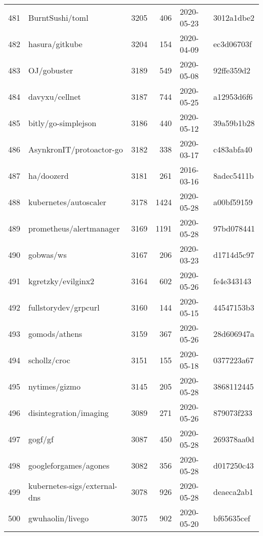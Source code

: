 \begin{longtable}{llrrll}
    481 &                                    BurntSushi/toml &   3205 &    406 & 2020-05-23 &  3012a1dbe2 \\
    482 &                                     hasura/gitkube &   3204 &    154 & 2020-04-09 &  ec3d06703f \\
    483 &                                        OJ/gobuster &   3189 &    549 & 2020-05-08 &  92ffe359d2 \\
    484 &                                     davyxu/cellnet &   3187 &    744 & 2020-05-25 &  a12953d6f6 \\
    485 &                                bitly/go-simplejson &   3186 &    440 & 2020-05-12 &  39a59b1b28 \\
    486 &                           AsynkronIT/protoactor-go &   3182 &    338 & 2020-03-17 &  c483abfa40 \\
    487 &                                         ha/doozerd &   3181 &    261 & 2016-03-16 &  8adec5411b \\
    488 &                              kubernetes/autoscaler &   3178 &   1424 & 2020-05-28 &  a00bf59159 \\
    489 &                            prometheus/alertmanager &   3169 &   1191 & 2020-05-28 &  97bd078441 \\
    490 &                                          gobwas/ws &   3167 &    206 & 2020-03-23 &  d1714d5c97 \\
    491 &                                 kgretzky/evilginx2 &   3164 &    602 & 2020-05-26 &  fe4e343143 \\
    492 &                               fullstorydev/grpcurl &   3160 &    144 & 2020-05-15 &  44547153b3 \\
    493 &                                      gomods/athens &   3159 &    367 & 2020-05-26 &  28d606947a \\
    494 &                                       schollz/croc &   3151 &    155 & 2020-05-18 &  0377223a67 \\
    495 &                                      nytimes/gizmo &   3145 &    205 & 2020-05-28 &  3868112445 \\
    496 &                             disintegration/imaging &   3089 &    271 & 2020-05-26 &  879073f233 \\
    497 &                                            gogf/gf &   3087 &    450 & 2020-05-28 &  269378aa0d \\
    498 &                              googleforgames/agones &   3082 &    356 & 2020-05-28 &  d017250c43 \\
    499 &                       kubernetes-sigs/external-dns &   3078 &    926 & 2020-05-28 &  deaeca2ab1 \\
    500 &                                   gwuhaolin/livego &   3075 &    902 & 2020-05-20 &  bf65635cef \\
\end{longtable}
